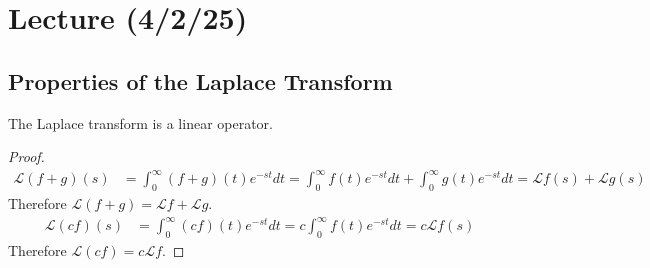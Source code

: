 \documentclass[notes]{subfiles}
\begin{document}
\setcounter{section}{16}
\section{Lecture (4/2/25)}

\subsection{Properties of the Laplace Transform}
\begin{lemma}
    The Laplace transform is a linear operator.
\end{lemma}
\begin{proof}
    \begin{align*}
        \mathcal{L}(f + g)(s)
        &= \int_0^\infty (f + g)(t)e^{-st}dt
        = \int_0^\infty f(t)e^{-st}dt + \int_0^\infty g(t)e^{-st}dt
        = \mathcal{L}f(s) + \mathcal{L}g(s)
    \end{align*}
    Therefore $\mathcal{L}(f + g) = \mathcal{L}f + \mathcal{L}g$.
    \begin{align*}
        \mathcal{L}(cf)(s)
        &= \int_0^\infty (cf)(t)e^{-st}dt
        = c\int_0^\infty f(t)e^{-st}dt
        = c\mathcal{L}f(s)
    \end{align*}
    Therefore $\mathcal{L}(cf) = c\mathcal{L}f$.
\end{proof}
\end{document}
